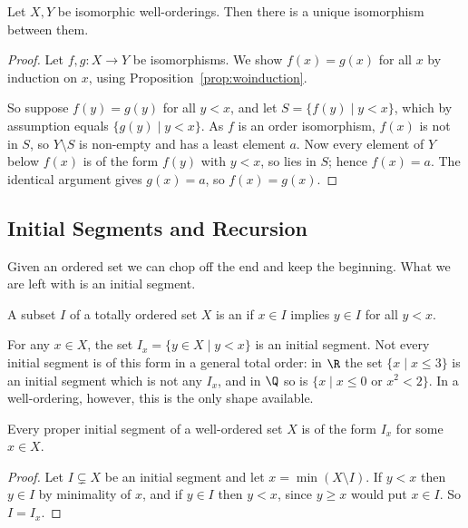 \begin{proposition}\label{prop:uniqueiso}
  Let $X, Y$ be isomorphic well-orderings. Then there is a unique isomorphism between them.
\end{proposition}
\begin{proof}
  Let $f, g: X \rightarrow Y$ be isomorphisms. We show $f(x) = g(x)$ for all $x$ by induction on $x$, using Proposition~\ref{prop:woinduction}.

  So suppose $f(y) = g(y)$ for all $y < x$, and let $S = \{f(y) \mid y < x\}$, which by assumption equals $\{g(y) \mid y < x\}$. As $f$ is an order isomorphism, $f(x)$ is not in $S$, so $Y \setminus S$ is non-empty and has a least element $a$. Now every element of $Y$ below $f(x)$ is of the form $f(y)$ with $y < x$, so lies in $S$; hence $f(x) = a$. The identical argument gives $g(x) = a$, so $f(x) = g(x)$.
\end{proof}

\subsection{Initial Segments and Recursion}

Given an ordered set we can chop off the end and keep the beginning. What we are left with is an initial segment.

\begin{definition}
  A subset $I$ of a totally ordered set $X$ is an  if $x \in I$ implies $y \in I$ for all $y < x$.
\end{definition}

For any $x \in X$, the set $I_x = \{y \in X \mid y < x\}$ is an initial segment. Not every initial segment is of this form in a general total order: in $\R$ the set $\{x \mid x \leq 3\}$ is an initial segment which is not any $I_x$, and in $\Q$ so is $\{x \mid x \leq 0 \text{ or } x^2 < 2\}$. In a well-ordering, however, this is the only shape available.

\begin{proposition}\label{prop:initialsegs}
  Every proper initial segment of a well-ordered set $X$ is of the form $I_x$ for some $x \in X$.
\end{proposition}
\begin{proof}
  Let $I \subsetneq X$ be an initial segment and let $x = \min(X \setminus I)$. If $y < x$ then $y \in I$ by minimality of $x$, and if $y \in I$ then $y < x$, since $y \geq x$ would put $x \in I$. So $I = I_x$.
\end{proof}

